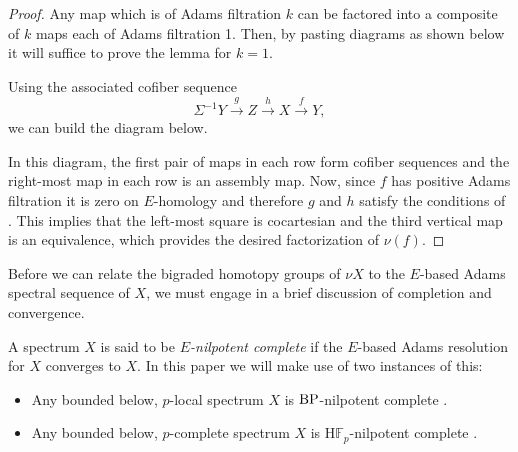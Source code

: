 \begin{proof}
  Any map which is of Adams filtration $k$ can be factored into a composite of $k$ maps each of Adams filtration 1. Then, by pasting diagrams as shown below it will suffice to prove the lemma for $k=1$.
  \begin{center}
  \end{center}  

  Using the associated cofiber sequence
  $$ \Sigma^{-1}Y \xrightarrow{g} Z \xrightarrow{h} X \xrightarrow{f} Y,  $$
  we can build the diagram below.
  \begin{center}
  \end{center}

  In this diagram, the first pair of maps in each row form cofiber sequences and the right-most map in each row is an assembly map.
  Now, since $f$ has positive Adams filtration it is zero on $E$-homology and therefore $g$ and $h$ satisfy the conditions of .
  This implies that the left-most square is cocartesian and the third vertical map is an equivalence, which provides the desired factorization of $\nu(f)$.
\end{proof}

Before we can relate the bigraded homotopy groups of $\nu X$ to the $E$-based Adams spectral sequence of $X$, we must engage in a brief discussion of completion and convergence.

\begin{dfn} \label{rmk:E-complete} \label{dfn:E-complete}
  A spectrum $X$ is said to be \emph{$E$-nilpotent complete} if the $E$-based Adams resolution for $X$ converges to $X$. In this paper we will make use of two instances of this:
  \begin{itemize}
      \item Any bounded below, $p$-local spectrum $X$ is $\mathrm{BP}$-nilpotent complete \cite[Theorem 6.5]{BousfieldLocalization}.
      \item Any bounded below, $p$-complete spectrum $X$ is $\mathrm{H}\mathbb{F}_p$-nilpotent complete \cite[Theorem 6.6]{BousfieldLocalization}.
  \end{itemize}
\end{dfn}

